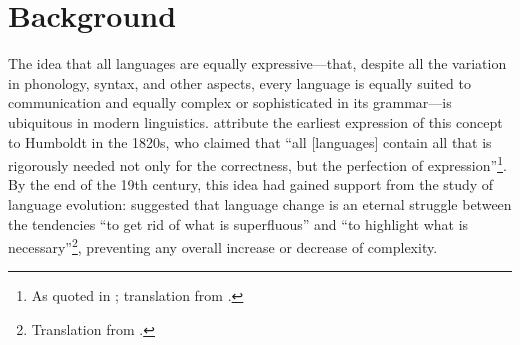 \documentclass[12pt,twoside]{article}
\newcommand*{\tocref}[1]{\hyperref[{#1}]{\ref*{#1}.~\nameref*{#1}}}
\begin{document}

\section{Background}
\label{sec:bg}

The idea that all languages are equally expressive---that, despite all the variation in phonology, syntax, and other aspects, every language is equally suited to communication and equally complex or sophisticated in its grammar---is ubiquitous in modern linguistics. \citet{joseph} attribute the earliest expression of this concept to Humboldt in the 1820s, who claimed that ``all [languages] contain all that is rigorously needed not only for the correctness, but the perfection of expression''\footnote{As quoted in \cite[8]{rémusat}; translation from \cite[344]{joseph}.}. By the end of the 19th century, this idea had gained support from the study of language evolution: \citet[227]{passy} suggested that language change is an eternal struggle between the tendencies ``to get rid of what is superfluous'' and ``to highlight what is necessary''\footnote{Translation from \cite[352]{joseph}.}, preventing any overall increase or decrease of complexity.
\end{document}
